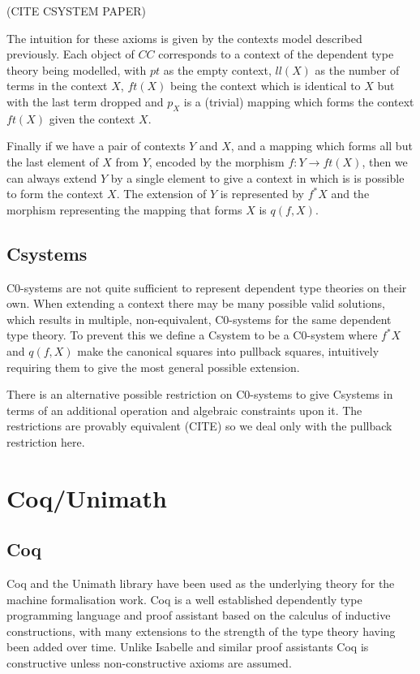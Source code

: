 (CITE CSYSTEM PAPER)

The intuition for these axioms is given by the contexts model described
previously. Each object of $CC$ corresponds to a context of the dependent type
theory being modelled, with $pt$ as the empty context, $ll(X)$ as the number of
terms in the context $X$, $ft(X)$ being the context which is identical to $X$
but with the last term dropped and $p_X$ is a (trivial) mapping which forms the
context $ft(X)$ given the context $X$.

Finally if we have a pair of contexts $Y$ and $X$, and a mapping which forms all
but the last element of $X$ from $Y$, encoded by the morphism $f: Y\to ft(X)$,
then we can always extend $Y$ by a single element to give a context in which is
is possible to form the context $X$. The extension of $Y$ is represented by
$f^*X$ and the morphism representing the mapping that forms $X$ is $q(f, X)$.

\subsection{Csystems}
C0-systems are not quite sufficient to represent dependent type theories on
their own. When extending a context there may be many possible valid solutions,
which results in multiple, non-equivalent, C0-systems for the same dependent
type theory. To prevent this we define a Csystem to be a C0-system where $f^*X$
and $q(f, X)$ make the canonical squares into pullback squares, intuitively
requiring them to give the most general possible extension.

There is an alternative possible restriction on C0-systems to give Csystems in
terms of an additional operation and algebraic constraints upon it. The
restrictions are provably equivalent (CITE) so we deal only with the pullback
restriction here.

\section{Coq/Unimath}
\subsection{Coq}
Coq and the Unimath library have been used as the underlying theory for the
machine formalisation work. Coq is a well established dependently type
programming language and proof assistant based on the calculus of inductive
constructions, with many extensions to the strength of the type theory having
been added over time. Unlike Isabelle and similar proof assistants Coq is
constructive unless non-constructive axioms are assumed. 

